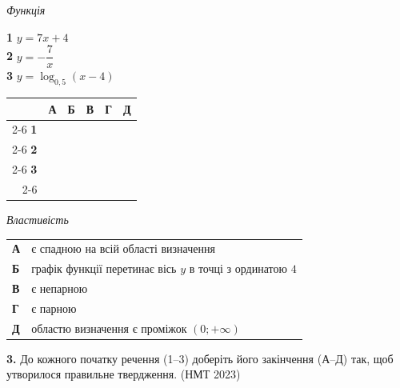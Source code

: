 \documentclass[14pt]{extarticle}
\newcommand{\nmtyear}[1]{\hfill{\small\color{yearcolor}(НМТ #1)}}
\begin{document}
\vspace{0.3cm}

\noindent
\begin{minipage}[t]{0.40\textwidth}
    \textit{Функція} \par \vspace{0.2cm}
    \textbf{1} \quad $y = 7x + 4$ \\[0.2cm]
    \textbf{2} \quad $y = -\dfrac{7}{x}$ \\[0.2cm]
    \textbf{3} \quad $y = \log_{0{,}5} (x-4)$
    
    \vspace{0.5cm}
    
    \begingroup
    \setlength{\tabcolsep}{4pt}
    \renewcommand{\arraystretch}{1.2}
    \small
    \begin{tabular}{r|c|c|c|c|c|}
         \multicolumn{1}{c}{} & \multicolumn{1}{c}{\textbf{А}} & \multicolumn{1}{c}{\textbf{Б}} & \multicolumn{1}{c}{\textbf{В}} & \multicolumn{1}{c}{\textbf{Г}} & \multicolumn{1}{c}{\textbf{Д}} \\ \cline{2-6}
         \textbf{1} & & & & & \\ \cline{2-6}
         \textbf{2} & & & & & \\ \cline{2-6}
         \textbf{3} & & & & & \\ \cline{2-6}
    \end{tabular}
    \endgroup
\end{minipage}%
\hfill
\begin{minipage}[t]{0.55\textwidth}
    \textit{Властивість} \par \vspace{0.2cm}
    \begin{tabular}{l p{6.5cm}}
    \textbf{А} & є спадною на всій області визначення \\
    \textbf{Б} & графік функції перетинає вісь $y$ в точці з ординатою $4$ \\
    \textbf{В} & є непарною \\
    \textbf{Г} & є парною \\
    \textbf{Д} & областю визначення є проміжок $(0; +\infty)$ \\
    \end{tabular}
\end{minipage}

\vspace{0.7cm}

\noindent\textbf{3.} До кожного початку речення (1--3) доберіть його закінчення (А--Д) так, щоб утворилося правильне твердження. \nmtyear{2023}
\end{document}
